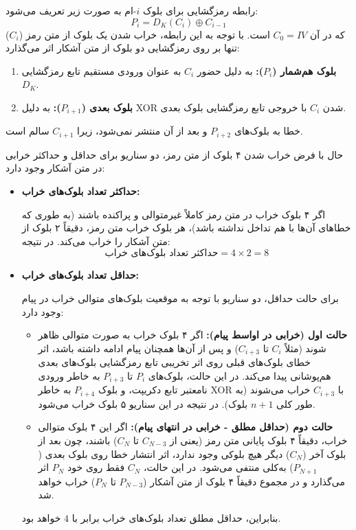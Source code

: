 رابطه رمزگشایی برای بلوک $i$-ام به صورت زیر تعریف می‌شود:
\[ P_i = D_K(C_i) \oplus C_{i-1} \]
که در آن $C_0 = IV$ است. با توجه به این رابطه، خراب شدن یک بلوک از متن رمز ($C_i$) تنها بر روی رمزگشایی دو بلوک از متن آشکار اثر می‌گذارد:
\begin{enumerate}
    \item \textbf{بلوک هم‌شمار ($P_i$):} به دلیل حضور $C_i$ به عنوان ورودی مستقیم تابع رمزگشایی $D_K$.
    \item \textbf{بلوک بعدی ($P_{i+1}$):} به دلیل XOR شدن $C_i$ با خروجی تابع رمزگشایی بلوک بعدی.
\end{enumerate}
خطا به بلوک‌های $P_{i+2}$ و بعد از آن منتشر نمی‌شود، زیرا $C_{i+1}$ سالم است.

حال با فرض خراب شدن ۴ بلوک از متن رمز، دو سناریو برای حداقل و حداکثر خرابی در متن آشکار وجود دارد:

\begin{itemize}
    \item \textbf{حداکثر تعداد بلوک‌های خراب:} 
    
    اگر ۴ بلوک خراب در متن رمز کاملاً غیرمتوالی و پراکنده باشند (به طوری که خطاهای آن‌ها با هم تداخل نداشته باشد)، هر بلوک خراب متن رمز، دقیقاً ۲ بلوک از متن آشکار را خراب می‌کند. در نتیجه:
    \[ \text{حداکثر تعداد بلوک‌های خراب} = 4 \times 2 = 8 \]

    \item \textbf{حداقل تعداد بلوک‌های خراب:} 
    
    برای حالت حداقل، دو سناریو با توجه به موقعیت بلوک‌های متوالی خراب در پیام وجود دارد:
    \begin{itemize}
        \item \textbf{حالت اول (خرابی در اواسط پیام):} اگر ۴ بلوک خراب به صورت متوالی ظاهر شوند (مثلاً $C_i$ تا $C_{i+3}$) و پس از آن‌ها همچنان پیام ادامه داشته باشد، اثر خطای بلوک‌های قبلی روی اثر تخریبی تابع رمزگشایی بلوک‌های بعدی هم‌پوشانی پیدا می‌کند. در این حالت، بلوک‌های $P_i$ تا $P_{i+3}$ به خاطر ورودی نامعتبر تابع دکریپت، و بلوک $P_{i+4}$ به خاطر XOR با $C_{i+3}$ خراب می‌شوند (به طور کلی $n+1$ بلوک). در نتیجه در این سناریو ۵ بلوک خراب می‌شود.
        
        \item \textbf{حالت دوم (حداقل مطلق - خرابی در انتهای پیام):} اگر این ۴ بلوک متوالی خراب، دقیقاً ۴ بلوک پایانی متن رمز (یعنی از $C_{N-3}$ تا $C_N$) باشند، چون بعد از بلوک آخر ($C_N$) دیگر هیچ بلوکی وجود ندارد، اثر انتشار خطا روی بلوک بعدی ($P_{N+1}$) به‌کلی منتفی می‌شود. در این حالت، $C_N$ فقط روی خود $P_N$ اثر می‌گذارد و در مجموع دقیقاً ۴ بلوک از متن آشکار ($P_{N-3}$ تا $P_N$) خراب خواهد شد.
    \end{itemize}
    بنابراین، حداقل مطلق تعداد بلوک‌های خراب برابر با $4$ خواهد بود.
\end{itemize}